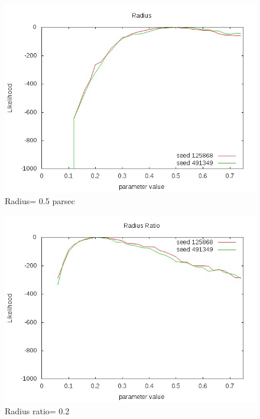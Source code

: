 \documentclass[12pt]{article}
\begin{document}
\begin{figure}[h!]
\centering
\includegraphics[width=20cm]{./plots/rad.jpeg}
\caption{Radius= 0.5 parsec}
\end{figure}

\begin{figure}[h!]
\centering
\includegraphics[width=20cm]{./plots/radratio.jpeg}
\caption{Radius ratio= 0.2}
\end{figure}
\end{document}
